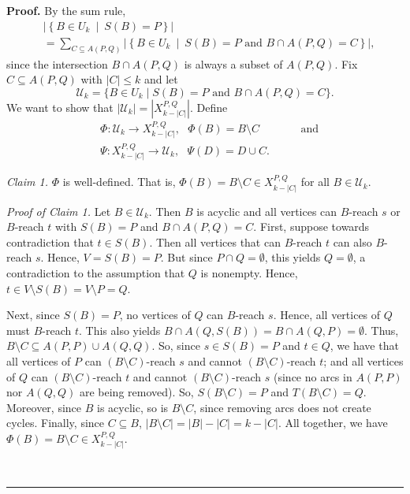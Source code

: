 \documentclass[numbers=enddot,12pt,final,onecolumn,notitlepage]{scrartcl}%
\theoremstyle{definition}
\newenvironment{proof}[1][Proof]{\noindent\textbf{#1.} }{\ \rule{0.5em}{0.5em}}
\let\sumnonlimits\sum
\renewcommand{\sum}{\sumnonlimits\limits}
\theoremstyle{plainsl}
\begin{document}
\begin{proof}
    By the sum rule, \begin{align*}
&  \left\vert \left\{  B\in U_{k}\ \mid\ S\left(  B\right)  =P\right\}
\right\vert \\
&  =\sum_{C\subseteq A\left(  P,Q\right)  }\left\vert \left\{  B\in
U_{k}\ \mid\ S\left(  B\right)  =P\text{ and }B\cap A\left(  P,Q\right)
=C\right\}  \right\vert ,
\end{align*}
since the intersection $B\cap A\left(  P,Q\right)  $ is always a subset of
$A\left(  P,Q\right)  $. Fix $C \subseteq A(P,Q)$ with $|C| \leq k$ and let \begin{equation*}
    \mathcal{U}_k = \{B \in U_{k} \mid  S(B) = P \text{ and } B \cap A(P,Q) = C\}.
\end{equation*} We want to show that $|\mathcal{U}_k| = |X_{k-|C|}^{P,Q}|$. Define \begin{align*}
    &\Phi : \mathcal{U}_k \to X_{k-|C|}^{P,Q}, \ \ \ \Phi(B) = B \setminus C \ \ \ \ \ \ \ \ \ \ \ \ \ \ \ \ \ \text{and} \\
    &\Psi : X_{k-|C|}^{P,Q} \to \mathcal{U}_{k}, \ \ \ \Psi(D) = D \cup C.
\end{align*}

\textit{Claim 1.} $\Phi$ is well-defined. That is, $\Phi(B) = B \setminus C \in X_{k-|C|}^{P,Q}$ for all $B \in \mathcal{U}_{k}$.

\smallskip
\textit{Proof of Claim 1.} Let $B \in \mathcal{U}_{k}$. Then $B$ is acyclic and all vertices can $B$-reach $s$ or $B$-reach $t$ with $S(B) = P$ and $B \cap A(P,Q) = C$. First, suppose towards contradiction that $t \in S(B)$. Then all vertices that can $B$-reach $t$ can also $B$-reach $s$. Hence, $V = S(B) = P$. But since $P \cap Q = \emptyset$, this yields $Q = \emptyset$, a contradiction to the assumption that $Q$ is nonempty. Hence, $t \in V \setminus S(B) = V \setminus P = Q$. 

Next, since $S(B) = P$, no vertices of $Q$ can $B$-reach $s$. Hence, all vertices of $Q$ must $B$-reach $t$. This also yields $B \cap A(Q,S(B)) = B \cap A(Q,P) = \emptyset$. Thus, $B \setminus C \subseteq A(P,P) \cup A(Q,Q)$. So, since $s \in S(B) = P$ and $t \in Q$, we have that all vertices of $P$ can $(B \setminus C)$-reach $s$ and cannot $(B \setminus C)$-reach $t$; and all vertices of $Q$ can $(B \setminus C)$-reach $t$ and cannot $(B \setminus C)$-reach $s$ (since no arcs in $A(P,P)$ nor $A(Q,Q)$ are being removed). So, $S(B \setminus C) = P$ and $T(B \setminus C) = Q$. Moreover, since $B$ is acyclic, so is $B \setminus C$, since removing arcs does not create cycles. Finally, since $C \subseteq B$, $|B \setminus C| = |B|-|C| = k-|C|$. All together, we have $\Phi(B) = B \setminus C \in X_{k-|C|}^{P,Q}$.


\end{proof}
\end{document}

